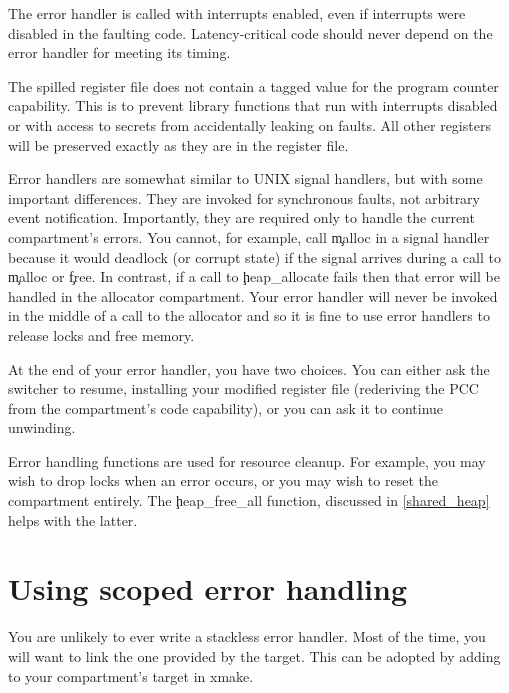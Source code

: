 
\begin{warning}
The error handler is called with interrupts enabled, even if interrupts were disabled in the faulting code.
Latency-critical code should never depend on the error handler for meeting its timing.
\end{warning}

The spilled register file does not contain a tagged value for the program counter capability.
This is to prevent library functions that run with interrupts disabled or with access to secrets from accidentally leaking on faults.
All other registers will be preserved exactly as they are in the register file.

\begin{note}
Error handlers are somewhat similar to UNIX signal handlers, but with some important differences.
They are invoked for synchronous faults, not arbitrary event notification.
Importantly, they are required only to handle the current compartment's errors.
You cannot, for example, call \c{malloc} in a signal handler because it would deadlock (or corrupt state) if the signal arrives during a call to \c{malloc} or \c{free}.
In contrast, if a call to \c{heap_allocate} fails then that error will be handled in the allocator compartment.
Your error handler will never be invoked in the middle of a call to the allocator and so it is fine to use error handlers to release locks and free memory.
\end{note}

At the end of your error handler, you have two choices.
You can either ask the switcher to resume, installing your modified register file (rederiving the PCC from the compartment's code capability), or you can ask it to continue unwinding.

Error handling functions are used for resource cleanup.
For example, you may wish to drop locks when an error occurs, or you may wish to reset the compartment entirely.
The \c{heap_free_all} function, discussed in \ref{shared_heap} helps with the latter.

\section{Using scoped error handling}

You are unlikely to ever write a stackless error handler.
Most of the time, you will want to link the one provided by the  target.
This can be adopted by adding  to your compartment's target in xmake.

